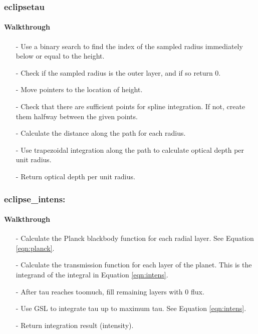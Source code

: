 \documentclass[letterpaper,12pt]{article}
\begin{document}
\newline

\newline

\newline

\subsubsection{eclipsetau}
\noindent
\paragraph{Walkthrough}
\begin{enumerate}[leftmargin=10pt, noitemsep, parsep=0pt, topsep=0ex]
\item[-] Use a binary search to find the index of the sampled radius immediately below or equal to the height.
\item[-] Check if the sampled radius is the outer layer, and if so return 0.
\item[-] Move pointers to the location of height.
\item[-] Check that there are sufficient points for spline integration. If not, create them halfway between the given points.
\item[-] Calculate the distance along the path for each radius.
\item[-] Use trapezoidal integration along the path to calculate optical depth per unit radius.
\item[-] Return optical depth per unit radius.
\end{enumerate}

\subsubsection{eclipse\_intens:}
\paragraph{Walkthrough}
\begin{enumerate}[leftmargin=10pt, noitemsep, parsep=0pt, topsep=0ex]
\item[-] Calculate the Planck blackbody function for each radial layer. See Equation \ref{eqn:planck}.
\item[-] Calculate the transmission function for each layer of the planet. This is the integrand of the integral in Equation \ref{eqn:intens}.
\item[-] After tau reaches toomuch, fill remaining layers with 0 flux.
\item[-] Use GSL to integrate tau up to maximum tau. See Equation \ref{eqn:intens}.
\item[-] Return integration result (intensity).
\end{enumerate}
\end{document}
